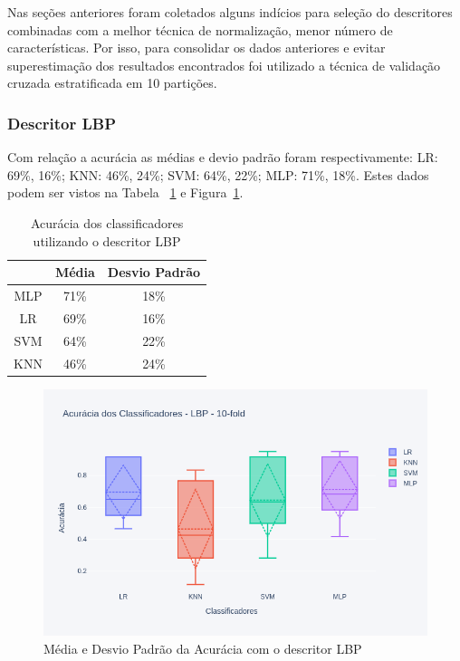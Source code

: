 Nas seções anteriores foram coletados alguns indícios para seleção do descritores combinadas com a melhor técnica de normalização, menor número de características. Por isso, para consolidar os dados anteriores e evitar superestimação dos resultados encontrados foi utilizado a técnica de validação cruzada estratificada em 10 partições.

\subsubsection{Descritor LBP}
Com relação a acurácia as médias e devio padrão foram respectivamente: LR: 69\%, 16\%; KNN: 46\%, 24\%; SVM: 64\%, 22\%; MLP: 71\%, 18\%. Estes dados podem ser vistos na Tabela ~\ref{tab:result_lbp} e Figura~\ref{fig:box_result_lbp}.


\begin{table}[!htbp]
	\caption{Acurácia dos classificadores utilizando o descritor LBP}
	\begin{center}
		\begin{tabular}{|c|c|c|}
			\hline
			& Média & Desvio Padrão \\
			\hline
			MLP       & 71\% & 18\% \\
			LR        & 69\% & 16\% \\
			SVM       & 64\% & 22\% \\
			KNN       & 46\% & 24\% \\
			\hline
		\end{tabular}
		\label{tab:result_lbp}
	\end{center}
\end{table}

\begin{figure}[!htbp]
	\centering
	\includegraphics[width=1.0\linewidth,clip=true,trim=0cm 0cm 0cm 0cm, keepaspectratio=true]{box_result_lbp.png}
	\caption{Média e Desvio Padrão da Acurácia com o descritor LBP}
	\label{fig:box_result_lbp}
\end{figure}

